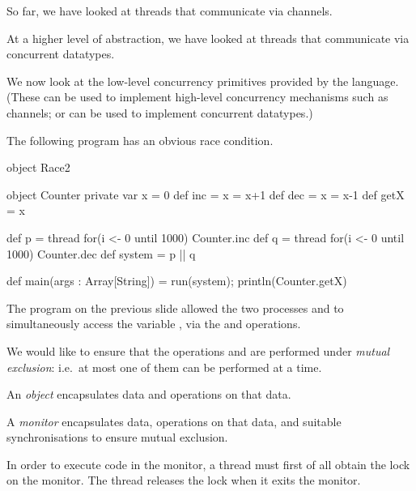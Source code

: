 
\begin{slide}

So far, we have looked at threads that communicate via channels.

At a higher level of abstraction, we have looked at threads that communicate
via concurrent datatypes. 

We now look at the low-level concurrency primitives provided by the language.
(These can be used to implement high-level concurrency mechanisms such as
channels; or can be used to implement concurrent datatypes.) 
\end{slide}


\begin{slide}

The following program has an obvious race condition.
%
\begin{scala}
object Race2{
  object Counter{
    private var x = 0
    def inc = x = x+1
    def dec = x = x-1
    def getX = x
  }

  def p = thread{ for(i <- 0 until 1000) Counter.inc }
  def q = thread{ for(i <- 0 until 1000) Counter.dec }
  def system = p || q

  def main(args : Array[String]) = { run(system); println(Counter.getX) }
}
\end{scala}
\end{slide}


\begin{slide}

The program on the previous slide allowed the two processes  and
 to simultaneously access the variable , via the
 and  operations.

We would like to ensure that the operations  and  are
performed under \emph{mutual exclusion}: i.e.~at most one of them can be
performed at a time.  
\end{slide}


\begin{slide}

An \emph{object} encapsulates data and operations on that data.

A \emph{monitor} encapsulates data, operations on that data, and suitable
synchronisations to ensure mutual exclusion.

In order to execute code in the monitor, a thread must first of all obtain the
lock on the monitor.  The thread releases the lock when it exits the monitor.
\end{slide}

